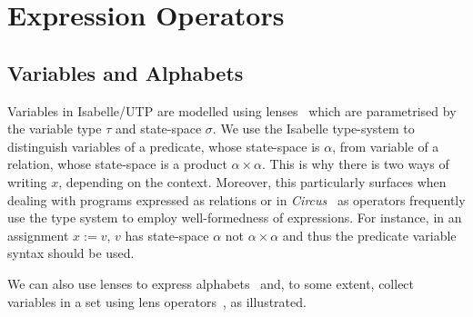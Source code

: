 \documentclass[11pt]{article}
\newcommand{\Circus}{\hbox{\textsf{\textsl{Circus}}}\xspace}
\begin{document}
\newpage

\section{Expression Operators}

\subsection{Variables and Alphabets}

Variables in Isabelle/UTP are modelled using lenses~\cite{Foster16a,Foster17a,Foster17b} which are parametrised by the
variable type $\tau$ and state-space $\sigma$.  We use the Isabelle type-system to distinguish variables of a predicate,
whose state-space is $\alpha$, from variable of a relation, whose state-space is a product $\alpha \times \alpha$. This
is why there is two ways of writing $x$, depending on the context. Moreover, this particularly surfaces when dealing
with programs expressed as relations or in \Circus~\cite{Oliveira&09} as operators frequently use the type system to
employ well-formedness of expressions. For instance, in an assignment $x := v$, $v$ has state-space $\alpha$ not
$\alpha \times \alpha$ and thus the predicate variable syntax should be used.

We can also use lenses to express alphabets~\cite{Foster17a} and, to some extent, collect variables in a set using lens
operators~\cite{Foster16a}, as illustrated.

\vspace{4ex}
\end{document}
